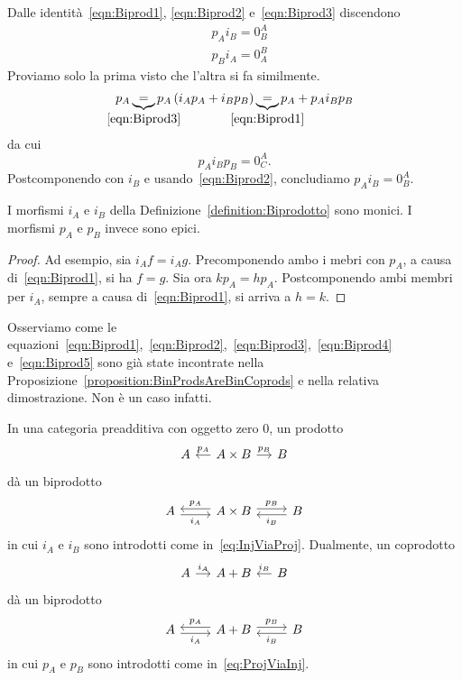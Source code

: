 \begin{remark}
  Dalle identità~\ref{eqn:Biprod1}, \ref{eqn:Biprod2}
  e~\ref{eqn:Biprod3} discendono
  \begin{align}
    & p_A i_B = 0_B^A \label{eqn:Biprod4} \\
    & p_B i_A = 0_A^B \label{eqn:Biprod5}
  \end{align}
  Proviamo solo la prima visto che l'altra si fa similmente.
  \[
    p_A \underbrace{=}_{\mathclap{\eqref{eqn:Biprod3}}} p_A \left( i_A
      p_A + i_B p_B \right)
    \underbrace{=}_{\mathclap{\eqref{eqn:Biprod1}}} p_A + p_A i_B p_B
  \]
  da cui
  \[
    p_A i_B p_B = 0_C^A .
  \]
  Postcomponendo con \(i_B\) e usando~\eqref{eqn:Biprod2}, concludiamo
  \(p_A i_B = 0_B^A\).
\end{remark}

\begin{proposition}
  I morfismi \(i_A\) e \(i_B\) della
  Definizione~\ref{definition:Biprodotto} sono monici. I morfismi
  \(p_A\) e \(p_B\) invece sono epici.
\end{proposition}

\begin{proof}
  Ad esempio, sia \(i_A f = i_A g\). Precomponendo ambo i mebri con
  \(p_A\), a causa di~\eqref{eqn:Biprod1}, si ha \(f = g\). Sia ora
  \(k p_A = h p_A\). Postcomponendo ambi membri per \(i_A\), sempre a
  causa di~\eqref{eqn:Biprod1}, si arriva a \(h = k\).
\end{proof}

Osserviamo come le
equazioni~\ref{eqn:Biprod1},~\ref{eqn:Biprod2},~\ref{eqn:Biprod3},~\ref{eqn:Biprod4}
e~\ref{eqn:Biprod5} sono già state incontrate nella
Proposizione~\ref{proposition:BinProdsAreBinCoprods} e nella relativa
dimostrazione. Non è un caso infatti.

\begin{proposition}\label{proposition:ProdsAndCoprodsAreBiprods}
  In una categoria preadditiva con oggetto zero \(0\), un prodotto
  \[
    \begin{tikzcd}[column sep=small]
      A & A \times B \ar["{p_A}", l, swap] \ar["{p_B}", r] & B
    \end{tikzcd}
  \]
  dà un biprodotto
  \[
    \begin{tikzcd}
      A \ar["{i_A}", r, shift right, swap] & A \times B \ar["{p_A}", l,
      shift right, swap] \ar["{p_B}", r, shift left] & B \ar["{i_B}", l,
      shift left]
    \end{tikzcd}
  \]
  in cui \(i_A\) e \(i_B\) sono introdotti come
  in~\eqref{eq:InjViaProj}. Dualmente, un coprodotto
  \[
    \begin{tikzcd}[column sep=small]
      A \ar["{i_A}", r] & A + B & B \ar["{i_B}", l, swap]
    \end{tikzcd}
  \]
  dà un biprodotto
  \[
    \begin{tikzcd}
      A \ar["{i_A}", r, shift right, swap] & A+B \ar["{p_A}", l, shift
      right, swap] \ar["{p_B}", r, shift left] & B \ar["{i_B}", l, shift
      left]
    \end{tikzcd}
  \]
  in cui \(p_A\) e \(p_B\) sono introdotti come
  in~\eqref{eq:ProjViaInj}.
\end{proposition}

